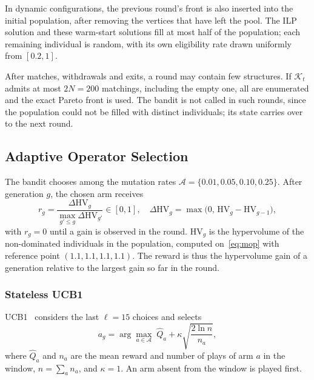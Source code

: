 \documentclass[journal]{IEEEtran}
\begin{document}
In dynamic configurations, the previous round's front is also inserted
into the initial population, after removing the vertices that have left
the pool. The ILP solution and these warm-start solutions fill at most
half of the population; each remaining individual is random, with its
own eligibility rate drawn uniformly from $[0.2, 1]$.

After matches, withdrawals and exits, a round may contain few
structures. If $\mathcal{K}_t$ admits at most $2N = 200$ matchings,
including the empty one, all are enumerated and the exact Pareto front
is used. The bandit is not called in such rounds, since the population
could not be filled with distinct individuals; its state carries over
to the next round.

\subsection{Adaptive Operator Selection}
\label{sec:method:aos}

The bandit chooses among the mutation rates
$\mathcal{A} = \{0.01, 0.05, 0.10, 0.25\}$. After generation $g$, the
chosen arm receives
\begin{equation}
  r_g = \frac{\Delta\mathrm{HV}_g}{\max_{g' \leq g} \Delta\mathrm{HV}_{g'}}
        \in [0, 1], \quad
  \Delta\mathrm{HV}_g = \max\bigl(0,\, \mathrm{HV}_g - \mathrm{HV}_{g-1}\bigr),
\label{eq:reward}
\end{equation}
with $r_g = 0$ until a gain is observed in the round. $\mathrm{HV}_g$ is
the hypervolume of the non-dominated individuals in the population,
computed on~\eqref{eq:mop} with reference point $(1.1, 1.1, 1.1, 1.1)$.
The reward is thus the hypervolume gain of a generation relative to the
largest gain so far in the round.

\subsubsection{Stateless UCB1}
UCB1~\cite{auer2002finite} considers the last $\ell = 15$ choices and
selects
\begin{equation}
  a_g = \arg\max_{a \in \mathcal{A}} \;
        \hat{Q}_a + \kappa \sqrt{\frac{2 \ln n}{n_a}} ,
  \label{eq:ucb1}
\end{equation}
where $\hat{Q}_a$ and $n_a$ are the mean reward and number of plays of
arm $a$ in the window, $n = \sum_a n_a$, and $\kappa = 1$. An arm absent
from the window is played first.
\end{document}

